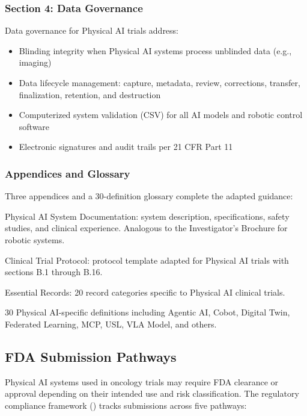 \documentclass[11pt,letterpaper]{article}
\begin{document}
\subsubsection{Section 4: Data Governance}

Data governance for Physical AI trials \SHALL{} address:

\begin{itemize}
  \item Blinding integrity when Physical AI systems process unblinded data (e.g., imaging)
  \item Data lifecycle management: capture, metadata, review, corrections, transfer, finalization, retention, and destruction
  \item Computerized system validation (CSV) for all AI models and robotic control software
  \item Electronic signatures and audit trails per 21 CFR Part 11
\end{itemize}

\subsubsection{Appendices and Glossary}

Three appendices and a 30-definition glossary complete the adapted guidance:

\begin{description}[leftmargin=2.5cm, style=sameline]
  \item[Appendix A] Physical AI System Documentation: system description, specifications, safety studies, and clinical experience. Analogous to the Investigator's Brochure for robotic systems.
  \item[Appendix B] Clinical Trial Protocol: protocol template adapted for Physical AI trials with sections B.1 through B.16.
  \item[Appendix C] Essential Records: 20 record categories specific to Physical AI clinical trials.
  \item[Glossary] 30 Physical AI-specific definitions including Agentic AI, Cobot, Digital Twin, Federated Learning, MCP, USL, VLA Model, and others.
\end{description}

\subsection{FDA Submission Pathways}

Physical AI systems used in oncology trials may require FDA clearance or approval depending on their intended use and risk classification. The regulatory compliance framework () tracks submissions across five pathways:
\end{document}
